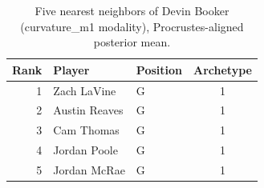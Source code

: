 \begin{table}[htbp]
  \centering\small
  \begin{tabular}{rllc}
    \toprule
    Rank & Player & Position & Archetype \\
    \midrule
    1 & Zach LaVine & G & 1 \\
    2 & Austin Reaves & G & 1 \\
    3 & Cam Thomas & G & 1 \\
    4 & Jordan Poole & G & 1 \\
    5 & Jordan McRae & G & 1 \\
    \bottomrule
  \end{tabular}
  \caption{Five nearest neighbors of Devin Booker (curvature_m1 modality), Procrustes-aligned posterior mean.}
  \label{tab:Devin_Booker_neighbors_curvature_m1}
\end{table}

